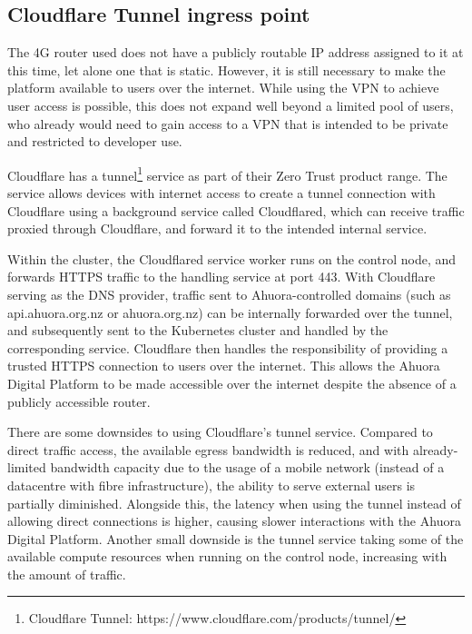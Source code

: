 \subsection{Cloudflare Tunnel ingress point}

The 4G router used does not have a publicly routable IP address assigned to it at this time, let alone one that is static. However, it is still necessary to make the platform available to users over the internet. While using the VPN to achieve user access is possible, this does not expand well beyond a limited pool of users, who already would need to gain access to a VPN that is intended to be private and restricted to developer use.

Cloudflare has a tunnel\footnote{Cloudflare Tunnel: https://www.cloudflare.com/products/tunnel/} service as part of their Zero Trust product range. The service allows devices with internet access to create a tunnel connection with Cloudflare using a background service called Cloudflared, which can receive traffic proxied through Cloudflare, and forward it to the intended internal service. 

Within the cluster, the Cloudflared service worker runs on the control node, and forwards HTTPS traffic to the handling service at port 443. With Cloudflare serving as the DNS provider, traffic sent to Ahuora-controlled domains (such as api.ahuora.org.nz or ahuora.org.nz) can be internally forwarded over the tunnel, and subsequently sent to the Kubernetes cluster and handled by the corresponding service. Cloudflare then handles the responsibility of providing a trusted HTTPS connection to users over the internet. This allows the Ahuora Digital Platform to be made accessible over the internet despite the absence of a publicly accessible router.

There are some downsides to using Cloudflare's tunnel service. Compared to direct traffic access, the available egress bandwidth is reduced, and with already-limited bandwidth capacity due to the usage of a mobile network (instead of a datacentre with fibre infrastructure), the ability to serve external users is partially diminished. Alongside this, the latency when using the tunnel instead of allowing direct connections is higher, causing slower interactions with the Ahuora Digital Platform. Another small downside is the tunnel service taking some of the available compute resources when running on the control node, increasing with the amount of traffic.


